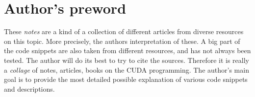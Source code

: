 \documentclass[12pt]{article}
\begin{document}


\newpage
\section*{Author's preword}
\label{disclaimer}
These \textit{notes} are a kind of a collection of different articles from diverse resources on this topic. More precisely, the authors interpretation 
of these. A big part of the code snippets 
are also taken from different resources, 
and has not always been tested. The author will do its best to try to cite the sources. 
Therefore it is really a \textit{collage} of notes, articles, books on the CUDA programming.
The author's main goal is to provide the most detailed possible explanation of 
various code snippets and descriptions.
\end{document}
